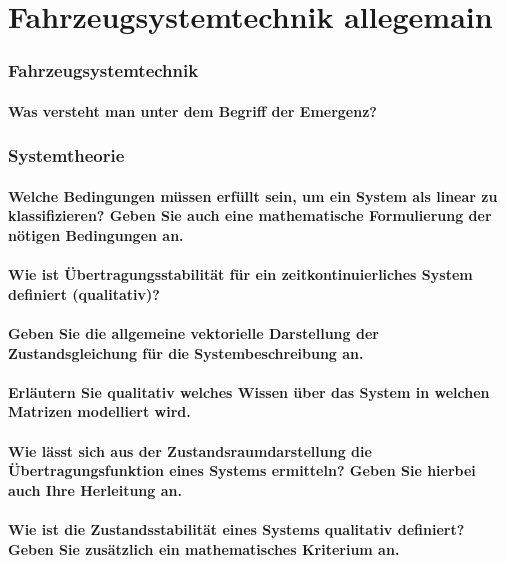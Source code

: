 \setcounter{section}{0}
\part{Fahrzeugsystemtechnik allegemain}
\section{Fahrzeugsystemtechnik}
\subsection{Was versteht man unter dem Begriff der Emergenz?}

\section{Systemtheorie}
\subsection{Welche Bedingungen müssen erfüllt sein, um ein System als linear zu klassifizieren?
    Geben Sie auch eine mathematische Formulierung der nötigen Bedingungen an.}
\subsection{Wie ist Übertragungsstabilität für ein zeitkontinuierliches System definiert (qualitativ)?}
\subsection{Geben Sie die allgemeine vektorielle Darstellung der Zustandsgleichung für die Systembeschreibung an. }
\subsection{Erläutern Sie qualitativ welches Wissen über das System in welchen Matrizen modelliert wird.}
\subsection{Wie lässt sich aus der Zustandsraumdarstellung die Übertragungsfunktion eines Systems ermitteln? Geben
Sie hierbei auch Ihre Herleitung an.}
\subsection{Wie ist die Zustandsstabilität eines Systems qualitativ definiert? Geben Sie zusätzlich ein mathematisches
Kriterium an.}